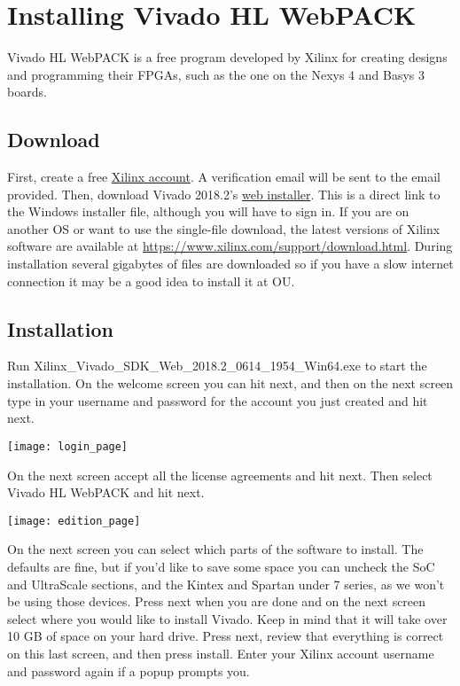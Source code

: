\section{Installing Vivado HL WebPACK}
Vivado HL WebPACK is a free program developed by Xilinx for creating designs and programming their
FPGAs, such as the one on the Nexys 4 and Basys 3 boards.

\subsection{Download}
First, create a free \href{https://www.xilinx.com/registration/create-account.html}
{Xilinx account}.
A verification email will be sent to the email provided.
Then, download Vivado 2018.2's
\href{https://www.xilinx.com/member/forms/download/xef.html?filename=Xilinx_Vivado_SDK_Web_2018.2_0614_1954_Win64.exe}
{web installer}.
This is a direct link to the Windows installer file, although you will have to sign in.
If you are on another OS or want to use the single-file download, the latest versions of Xilinx
software are available at \url{https://www.xilinx.com/support/download.html}.
During installation several gigabytes of files are downloaded so if you have a slow internet
connection it may be a good idea to install it at OU.

\subsection{Installation}
Run Xilinx\_Vivado\_SDK\_Web\_2018.2\_0614\_1954\_Win64.exe to start the installation.
On the welcome screen you can hit next, and then on the next screen type in your username and
password for the account you just created and hit next.

\begin{center}
    \texttt{[image: login\_page]}
\end{center}

On the next screen accept all the license agreements and hit next.
Then select Vivado HL WebPACK and hit next.

\begin{center}
    \texttt{[image: edition\_page]}
\end{center}

On the next screen you can select which parts of the software to install.
The defaults are fine, but if you’d like to save some space you can uncheck the SoC and UltraScale
sections, and the Kintex and Spartan under 7 series, as we won’t be using those devices.
Press next when you are done and on the next screen select where you would like to install Vivado.
Keep in mind that it will take over 10 GB of space on your hard drive.
Press next, review that everything is correct on this last screen, and then press install.
Enter your Xilinx account username and password again if a popup prompts you.

